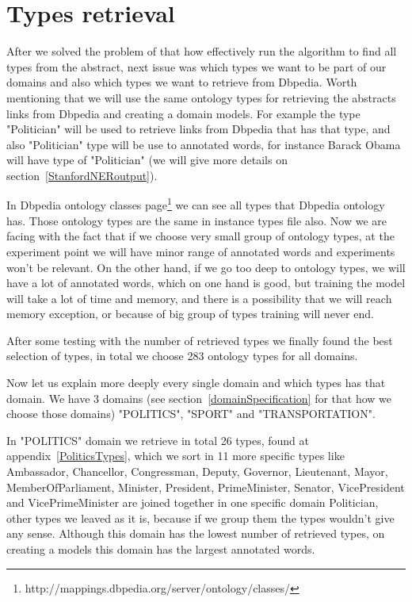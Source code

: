 \documentclass[thesis=M,english]{FITthesis}[2018/05/30]
\begin{document}
\section{Types retrieval}\label{typesRetrieval}
After we solved the problem of that how effectively run the algorithm to find all types from the abstract, next issue was which types we want to be part of our domains and also which types we want to retrieve from Dbpedia. Worth mentioning that we will use the same ontology types for retrieving the abstracts links from Dbpedia and creating a domain models. For example the type "Politician" will be used to retrieve links from Dbpedia that has that type, and also "Politician" type will be use to annotated words, for instance Barack Obama will have type of "Politician" (we will give more details on section~\ref{StanfordNERoutput}).

In Dbpedia ontology classes page\footnote{http://mappings.dbpedia.org/server/ontology/classes/} we can see all types that Dbpedia ontology has. Those ontology types are the same in instance types file also. Now we are facing with the fact that if we choose very small group of ontology types, at the experiment point we will have minor range of annotated words and experiments won't be relevant. On the other hand, if we go too deep to ontology types, we will have a lot of annotated words, which on one hand is good, but training the model will take a lot of time and memory, and there is a possibility that we will reach memory exception, or because of big group of types training will never end.  

After some testing with the number of retrieved types we finally found the best selection of types, in total we choose 283 ontology types for all domains.

Now let us explain more deeply every single domain and which types has that domain. We have 3 domains (see section~\ref{domainSpecification} for that how we choose those domains) "POLITICS", "SPORT" and "TRANSPORTATION".

In "POLITICS" domain we retrieve in total 26 types, found at appendix~\ref{PoliticsTypes}, which we sort in 11 more specific types like Ambassador, Chancellor, Congressman, Deputy, Governor, Lieutenant, Mayor, MemberOfParliament, Minister, President, PrimeMinister, Senator, VicePresident and VicePrimeMinister are joined together in one specific domain Politician, other types we leaved as it is, because if we group them the types wouldn't give any sense. Although this domain has the lowest number of retrieved types, on creating a models this domain has the largest annotated words. 
\end{document}
